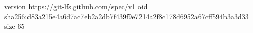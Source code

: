 version https://git-lfs.github.com/spec/v1
oid sha256:d83a215e4a6d7ac7eb2a2db7f439f9e7214a2f8c178d6952a67cff594b3a3d33
size 65
